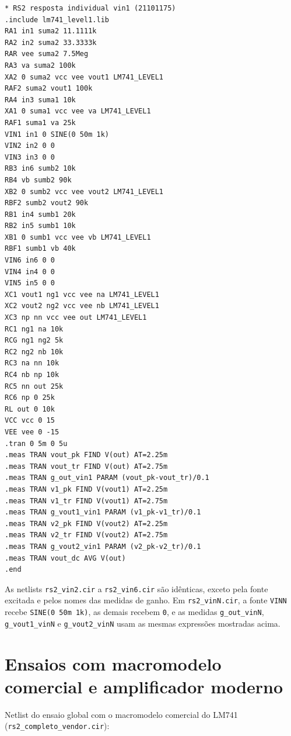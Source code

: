 {\small
\begin{verbatim}
* RS2 resposta individual vin1 (21101175)
.include lm741_level1.lib
RA1 in1 suma2 11.1111k
RA2 in2 suma2 33.3333k
RAR vee suma2 7.5Meg
RA3 va suma2 100k
XA2 0 suma2 vcc vee vout1 LM741_LEVEL1
RAF2 suma2 vout1 100k
RA4 in3 suma1 10k
XA1 0 suma1 vcc vee va LM741_LEVEL1
RAF1 suma1 va 25k
VIN1 in1 0 SINE(0 50m 1k)
VIN2 in2 0 0
VIN3 in3 0 0
RB3 in6 sumb2 10k
RB4 vb sumb2 90k
XB2 0 sumb2 vcc vee vout2 LM741_LEVEL1
RBF2 sumb2 vout2 90k
RB1 in4 sumb1 20k
RB2 in5 sumb1 10k
XB1 0 sumb1 vcc vee vb LM741_LEVEL1
RBF1 sumb1 vb 40k
VIN6 in6 0 0
VIN4 in4 0 0
VIN5 in5 0 0
XC1 vout1 ng1 vcc vee na LM741_LEVEL1
XC2 vout2 ng2 vcc vee nb LM741_LEVEL1
XC3 np nn vcc vee out LM741_LEVEL1
RC1 ng1 na 10k
RCG ng1 ng2 5k
RC2 ng2 nb 10k
RC3 na nn 10k
RC4 nb np 10k
RC5 nn out 25k
RC6 np 0 25k
RL out 0 10k
VCC vcc 0 15
VEE vee 0 -15
.tran 0 5m 0 5u
.meas TRAN vout_pk FIND V(out) AT=2.25m
.meas TRAN vout_tr FIND V(out) AT=2.75m
.meas TRAN g_out_vin1 PARAM (vout_pk-vout_tr)/0.1
.meas TRAN v1_pk FIND V(vout1) AT=2.25m
.meas TRAN v1_tr FIND V(vout1) AT=2.75m
.meas TRAN g_vout1_vin1 PARAM (v1_pk-v1_tr)/0.1
.meas TRAN v2_pk FIND V(vout2) AT=2.25m
.meas TRAN v2_tr FIND V(vout2) AT=2.75m
.meas TRAN g_vout2_vin1 PARAM (v2_pk-v2_tr)/0.1
.meas TRAN vout_dc AVG V(out)
.end
\end{verbatim}
}

As netlists \texttt{rs2\_vin2.cir} a \texttt{rs2\_vin6.cir} são
idênticas, exceto pela fonte excitada e pelos nomes das medidas de
ganho. Em \texttt{rs2\_vinN.cir}, a fonte \texttt{VINN} recebe
\texttt{SINE(0 50m 1k)}, as demais recebem \texttt{0}, e as medidas
\texttt{g\_out\_vinN}, \texttt{g\_vout1\_vinN} e
\texttt{g\_vout2\_vinN} usam as mesmas expressões mostradas acima.

\section{Ensaios com macromodelo comercial e amplificador moderno}
\label{ap:variantes}

Netlist do ensaio global com o macromodelo comercial do LM741
(\texttt{rs2\_completo\_vendor.cir}):

